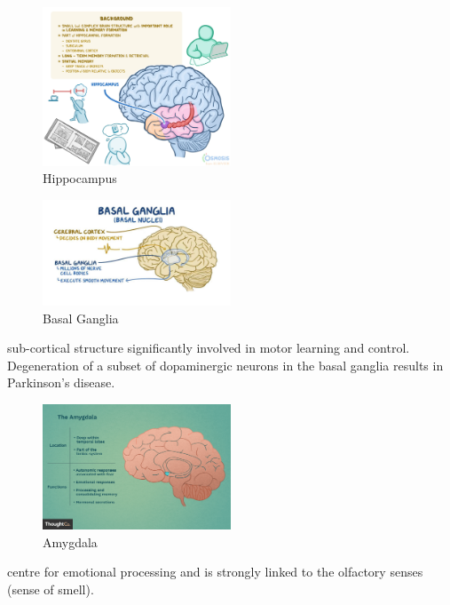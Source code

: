 \documentclass{article}
\begin{document}
    \begin{figure}[H]
    \centering
    \includegraphics[width=0.5\textwidth]{assets/hippocampus.png}
    \caption{Hippocampus}
    \end{figure}
    
    \begin{figure}[H]
    \centering
    \includegraphics[width=0.5\textwidth]{assets/basalGanglia.png}
    \caption{Basal Ganglia}
    \end{figure}
    
    \noindent sub-cortical structure significantly involved in motor learning and control. Degeneration of a subset of dopaminergic neurons in the basal ganglia results in Parkinson's disease.
    
    \begin{figure}[H]
    \centering
    \includegraphics[width=0.5\textwidth]{assets/amygdala.png}
    \caption{Amygdala}
    \end{figure}
    
    \noindent centre for emotional processing and is strongly linked to the olfactory senses (sense of smell).
    
\end{document}
